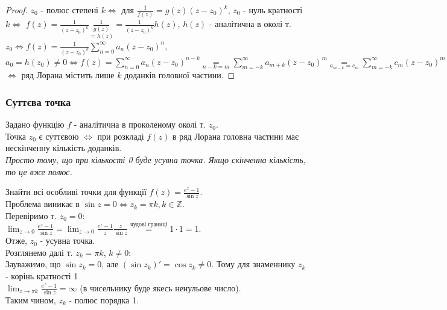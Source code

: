 \documentclass{math_library}
\begin{document}
\begin{proof}
$z_0$ - полюс степені $k \iff$ для $\displaystyle \frac{1}{f(z)} = g(z)(z-z_0)^k$, $z_0$ - нуль кратності $k \iff$ $\displaystyle f(z)=\frac{1}{(z-z_0)^k} \underset{=h(z)}{\frac{1}{g(z)}} = \frac{1}{(z-z_0)^k} h(z)$, $h(z)$ - аналітична в околі т. $z_0 \iff \displaystyle f(z)=\frac{1}{(z-z_0)^k} \sum_{n=0}^{\infty}a_n(z-z_0)^n$, $a_0 = h(z_0) \neq 0 \iff \displaystyle f(z)=\sum_{n=0}^{\infty} a_n(z-z_0)^{n-k} \underset{n-k=m}{=} \sum_{m=-k}^{\infty} a_{m+k}(z-z_0)^{m} \underset{a_{m-k}=c_m}{=} \sum_{m=-k}^{\infty} c_m (z-z_0)^{m}$ $\iff$ ряд Лорана містить лише $k$ доданків головної частини.
\end{proof}


\subsubsection{Суттєва точка}
\begin{theorem}
Задано функцію $f$ - аналітична в проколеному околі т. $z_0$.\\
Точка $z_0$ є суттєвою $\iff$ при розкладі $f(z)$ в ряд Лорана головна частини має нескінченну кількість доданків.\\
\textit{Просто тому, що при кількості 0 буде усувна точка. Якщо скінченна кількість, то це вже полюс.}
\end{theorem}

\begin{example}
Знайти всі особливі точки для функції $\displaystyle f(z) = \frac{e^z-1}{\sin z}$.\\
Проблема виникає в $\sin z = 0 \iff z_k = \pi k, k \in \mathbb{Z}$.\\
Перевіримо т. $z_0 = 0$:\\
$\displaystyle \lim_{z \to 0} \frac{e^z-1}{\sin z} = \lim_{z \to 0} \frac{e^z-1}{z} \frac{z}{\sin z} \overset{\textrm{чудові границі}}{=} 1 \cdot 1 = 1$.\\
Отже, $z_0$ - усувна точка.\\
Розглянемо далі т. $z_{k} = \pi k$, $k \neq 0$:\\
Зауважимо, що $\sin z_k = 0$, але $(\sin z_k)' = \cos z_k \neq 0$. Тому для знаменнику $z_k$ - корінь кратності 1\\
$\displaystyle \lim_{z \to \pi k} \frac{e^z-1}{\sin z} = \infty$ (в чисельнику буде якесь ненульове число).\\
Таким чином, $z_k$ - полюс порядка 1.
\end{example}
\end{document}
